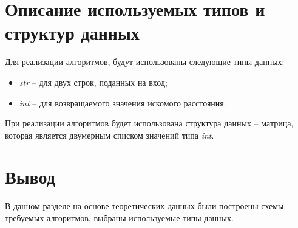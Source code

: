 \section{Описание используемых типов и структур данных}

Для реализации алгоритмов, будут использованы следующие типы данных:
\begin{itemize}
	\item \textit{str} -- для двух строк, поданных на вход;
	\item \textit{int} -- для возвращаемого значения искомого расстояния.
\end{itemize}

При реализации алгоритмов будет использована структура данных -- матрица, которая является двумерным списком значений типа \textit{int}.


\section*{Вывод}

В данном разделе на основе теоретических данных были построены схемы требуемых алгоритмов, выбраны используемые типы данных.
